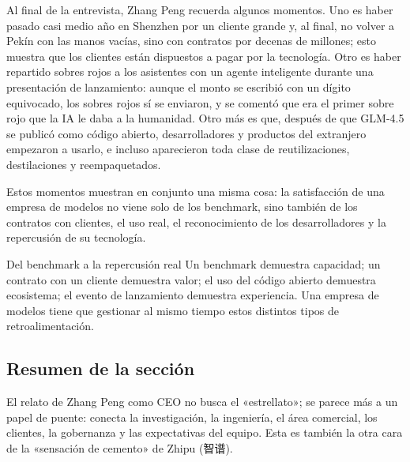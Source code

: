 Al final de la entrevista, Zhang Peng recuerda algunos momentos. Uno es haber pasado casi medio año en Shenzhen por un cliente grande y, al final, no volver a Pekín con las manos vacías, sino con contratos por decenas de millones; esto muestra que los clientes están dispuestos a pagar por la tecnología. Otro es haber repartido sobres rojos a los asistentes con un agente inteligente durante una presentación de lanzamiento: aunque el monto se escribió con un dígito equivocado, los sobres rojos sí se enviaron, y se comentó que era el primer sobre rojo que la IA le daba a la humanidad. Otro más es que, después de que GLM-4.5 se publicó como código abierto, desarrolladores y productos del extranjero empezaron a usarlo, e incluso aparecieron toda clase de reutilizaciones, destilaciones y reempaquetados.

Estos momentos muestran en conjunto una misma cosa: la satisfacción de una empresa de modelos no viene solo de los benchmark, sino también de los contratos con clientes, el uso real, el reconocimiento de los desarrolladores y la repercusión de su tecnología.

\begin{knowledgebox}{Del benchmark a la repercusión real}
Un benchmark demuestra capacidad; un contrato con un cliente demuestra valor; el uso del código abierto demuestra ecosistema; el evento de lanzamiento demuestra experiencia. Una empresa de modelos tiene que gestionar al mismo tiempo estos distintos tipos de retroalimentación.
\end{knowledgebox}

\subsection{Resumen de la sección}

El relato de Zhang Peng como CEO no busca el «estrellato»; se parece más a un papel de puente: conecta la investigación, la ingeniería, el área comercial, los clientes, la gobernanza y las expectativas del equipo. Esta es también la otra cara de la «sensación de cemento» de Zhipu (智谱).
